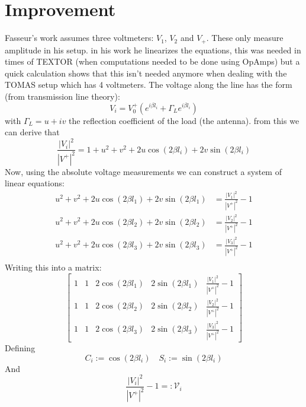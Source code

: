 \section{Improvement}
Fasseur's work assumes three voltmeters: $V_1$, $V_2$ and $V_+$. 
These only measure amplitude in his setup. in his work he linearizes the equations, 
this was needed in times of TEXTOR (when computations needed to be done using OpAmps) but 
a quick calculation shows that this isn't needed anymore when dealing with the TOMAS setup which has 4 voltmeters. 
The voltage along the line has the form (from transmission line theory):
\begin{equation}
	V_i = V_0^+(e^{i\beta l_i} + \Gamma_L e^{i\beta l_i})
\end{equation}
with $\Gamma_L= u + iv$ the reflection coefficient of the load (the antenna).
from this we can derive that
\begin{equation}
	\frac{|V_i|^2}{|V^+|^2} = 1 + u^2 + v^2 + 2u \cos(2\beta l_i)  + 2v \sin(2\beta l_i) 
\end{equation}
Now, using the absolute voltage measurements we can construct a system of linear equations:
\begin{eqnarray*}
	 u^2 + v^2 + 2u \cos(2\beta l_1)  + 2v \sin(2\beta l_1) &= \frac{|V_1|^2}{|V^+|^2} -1\\
	 u^2 + v^2 + 2u \cos(2\beta l_2)  + 2v \sin(2\beta l_2) &= \frac{|V_2|^2}{|V^+|^2} -1\\
	 u^2 + v^2 + 2u \cos(2\beta l_3)  + 2v \sin(2\beta l_3) &= \frac{|V_3|^2}{|V^+|^2} -1\\
\end{eqnarray*}
Writing this into a matrix:
\begin{equation*}
	\begin{bmatrix}
		1 & 1 & 2\cos(2\beta l_1) & 2\sin(2\beta l_1) & \frac{|V_1|^2}{|V^+|^2} -1\\
		1 & 1 & 2\cos(2\beta l_2) & 2\sin(2\beta l_2) & \frac{|V_2|^2}{|V^+|^2} -1\\
		1 & 1 & 2\cos(2\beta l_3) & 2\sin(2\beta l_3) & \frac{|V_3|^2}{|V^+|^2} -1
	\end{bmatrix}
\end{equation*}
Defining 
\begin{equation}
\boxed{C_i := \cos(2\beta l_i)} \quad \boxed{S_i := \sin(2\beta l_i)} 
\end{equation}
And
\begin{equation}
	\boxed{\frac{|V_i|^2}{|V^+|^2} -1 =: \mathcal{V}_i}
\end{equation}

